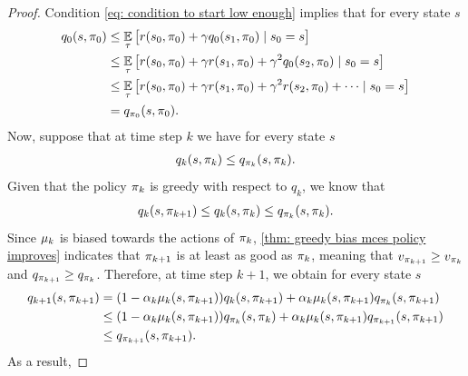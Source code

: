 \begin{proof}
Condition \eqref{eq: condition to start low enough} implies that for every state $s$
\begin{align*}
    q_0(s, \pi_0) 
    &\leq 
    \operatorname*{\mathbb{E}}_{\tau} \big[ r(s_0, \pi_0) + \gamma q_0(s_1, \pi_0) \mid s_0 = s \big]
    \\
    &\leq 
    \operatorname*{\mathbb{E}}_{\tau} \big[ r(s_0, \pi_0) + \gamma r(s_1, \pi_0) + \gamma^2 q_0(s_2, \pi_0) \mid s_0 = s \big]
    \\
    &\leq 
    \operatorname*{\mathbb{E}}_{\tau} \big[ r(s_0, \pi_0) + \gamma r(s_1, \pi_0) + \gamma^2 r(s_2, \pi_0) + \dots \mid s_0 = s \big]
    \\
    &= q_{\pi_0}(s, \pi_0) .
\end{align*}
Now, suppose that at time step $k$ we have for every state $s$
\begin{align*}
    q_k(s, \pi_k) \leq q_{\pi_k}(s, \pi_k) .
\end{align*}
Given that the policy $\pi_k$ is greedy with respect to $q_k$, we know that
\begin{align*}
    q_k(s, \pi_{{k+1}}) \leq q_k(s, \pi_k) \leq q_{\pi_k}(s, \pi_k) .
\end{align*}
Since $\mu_k$ is biased towards the actions of $\pi_k$, \autoref{thm: greedy bias mces policy improves} indicates that $\pi_{{k+1}}$ is at least as good as $\pi_k$, 
meaning that $v_{\pi_{{k+1}}} \geq v_{\pi_k}$ and $q_{\pi_{{k+1}}} \geq q_{\pi_k}$.
Therefore, at time step $k+1$, we obtain for every state $s$
\begin{align*}
    q_{{k+1}}(s, \pi_{{k+1}})
    &= (1 - \alpha_k \mu_k(s, \pi_{{k+1}})) q_k(s, \pi_{{k+1}}) 
    + \alpha_k \mu_k(s, \pi_{{k+1}}) q_{\pi_k}(s, \pi_{{k+1}}) 
    \\
    &\leq (1 - \alpha_k \mu_k(s, \pi_{{k+1}})) q_{\pi_k}(s, \pi_k) 
    + \alpha_k \mu_k(s, \pi_{{k+1}}) q_{\pi_{{k+1}}}(s, \pi_{{k+1}})
    \\
    &\leq q_{\pi_{{k+1}}}(s, \pi_{{k+1}}) .
\end{align*}
As a result, 

\end{proof}
